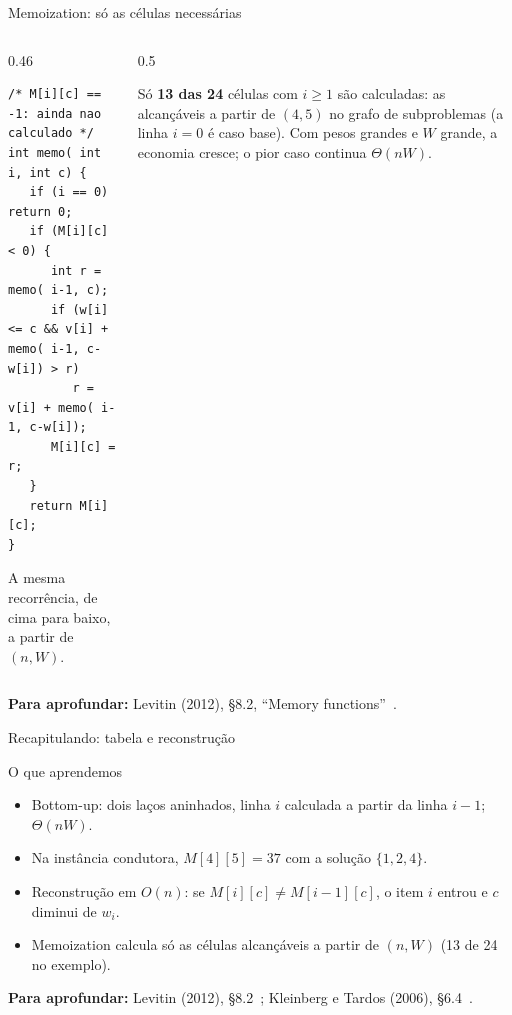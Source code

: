 \documentclass[aspectratio=169,xcolor=table]{beamer}
\newcommand{\marca}[3]{\fill[#3] ({#2*0.75-0.375},{-#1*0.5-0.25}) rectangle +(0.75,0.5);}
\newcommand{\gradeMochila}[1]{%
  \foreach \c in {0,...,5}
    \node[font=\tiny\bfseries, gray!60!black] at ({\c*0.75},0.45) {$c{=}\c$};
  \foreach \r/\rot in {0/{$i{=}0$}, 1/{$1\;(2,12)$}, 2/{$2\;(1,10)$}, 3/{$3\;(3,20)$},
                       4/{$4\;(2,15)$}}
    \node[font=\tiny, anchor=east] at (-0.42,{-\r*0.5}) {\rot};
  \foreach \lin [count=\i from 0] in #1
    \foreach \x [count=\c from 0] in \lin
      \node[cel] at ({\c*0.75},{-\i*0.5}) {\x};%
}
\newcommand{\valoresMemo}{{0,0,0,0,0,0},{0,0,12,12,12,12},{0,--,12,22,--,22},%
  {--,--,--,22,--,32},{--,--,--,--,--,37}}
\newcommand{\fonte}[1]{%
  \vfill
  {\tiny\color{gray!55!black}\textbf{Para aprofundar:} #1\par}%
}
\begin{document}
\begin{frame}[fragile]{Memoization: só as células necessárias}
  \begin{columns}[c]
    \begin{column}{0.46\textwidth}
\begin{lstlisting}[basicstyle=\ttfamily\tiny]
/* M[i][c] == -1: ainda nao calculado */
int memo( int i, int c) {
   if (i == 0) return 0;
   if (M[i][c] < 0) {
      int r = memo( i-1, c);
      if (w[i] <= c && v[i] + memo( i-1, c-w[i]) > r)
         r = v[i] + memo( i-1, c-w[i]);
      M[i][c] = r;
   }
   return M[i][c];
}
\end{lstlisting}
      \scriptsize A mesma recorrência, de cima para baixo, a partir de $(n,W)$.
    \end{column}
    \begin{column}{0.5\textwidth}
      \centering
      \medskip

      \scriptsize Só \textbf{13 das 24} células com $i \ge 1$ são calculadas: as
      alcançáveis a partir de $(4,5)$ no grafo de subproblemas (a linha $i=0$ é caso base). Com pesos grandes e $W$ grande, a economia
      cresce; o pior caso continua $\Theta(nW)$.
    \end{column}
  \end{columns}
  \fonte{Levitin (2012), \S 8.2, ``Memory functions''~\cite{levitin2012introduction}.}
\end{frame}

\begin{frame}{Recapitulando: tabela e reconstrução}
  \begin{block}{O que aprendemos}
    \begin{itemize}\scriptsize
      \item Bottom-up: dois laços aninhados, linha $i$ calculada a partir da linha $i-1$;
            $\Theta(nW)$.
      \item Na instância condutora, $M[4][5] = 37$ com a solução $\{1,2,4\}$.
      \item Reconstrução em $O(n)$: se $M[i][c] \ne M[i-1][c]$, o item $i$ entrou e
            $c$ diminui de $w_i$.
      \item Memoization calcula só as células alcançáveis a partir de $(n,W)$
            (13 de 24 no exemplo).
    \end{itemize}
  \end{block}
  \fonte{Levitin (2012), \S 8.2~\cite{levitin2012introduction};
    Kleinberg e Tardos (2006), \S 6.4~\cite{kleinberg2006algorithm}.}
\end{frame}
\end{document}
